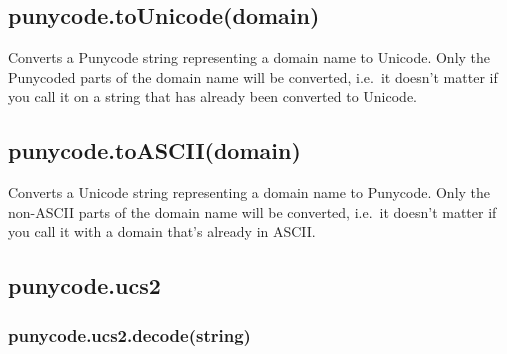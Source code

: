 \subsection{punycode.toUnicode(domain)}

Converts a Punycode string representing a domain name to Unicode. Only
the Punycoded parts of the domain name will be converted, i.e.~it
doesn't matter if you call it on a string that has already been
converted to Unicode.

\begin{Shaded}
\begin{Highlighting}[]
\NormalTok{(}\NormalTok{); }
\NormalTok{(}\NormalTok{); }
\end{Highlighting}
\end{Shaded}

\subsection{punycode.toASCII(domain)}

Converts a Unicode string representing a domain name to Punycode. Only
the non-ASCII parts of the domain name will be converted, i.e.~it
doesn't matter if you call it with a domain that's already in ASCII.

\begin{Shaded}
\begin{Highlighting}[]
\NormalTok{(}\NormalTok{); }
\NormalTok{(}\NormalTok{); }
\end{Highlighting}
\end{Shaded}

\subsection{punycode.ucs2}

\subsubsection{punycode.ucs2.decode(string)}

